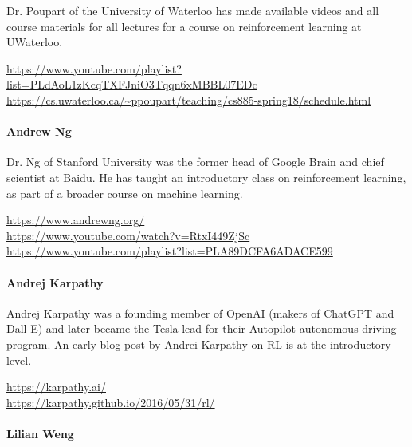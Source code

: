 Dr. Poupart of the University of Waterloo has made available videos and all course materials for all lectures for a course on reinforcement learning at UWaterloo. \\

\begin{resourcebox}
\footnotesize
\url{https://www.youtube.com/playlist?list=PLdAoL1zKcqTXFJniO3Tqqn6xMBBL07EDc} \\

\url{https://cs.uwaterloo.ca/~ppoupart/teaching/cs885-spring18/schedule.html}
\end{resourcebox}


\paragraph*{Andrew Ng}

Dr. Ng of Stanford University was the former head of Google Brain and chief scientist at Baidu. He has taught an introductory class on reinforcement learning, as part of a broader course on machine learning. \\

\begin{resourcebox}
\footnotesize
\url{https://www.andrewng.org/} \\

\url{https://www.youtube.com/watch?v=RtxI449ZjSc} \\

\url{https://www.youtube.com/playlist?list=PLA89DCFA6ADACE599}
\end{resourcebox}


\paragraph*{Andrej Karpathy}

Andrej Karpathy was a founding member of OpenAI (makers of ChatGPT and Dall-E) and later became the Tesla lead for their Autopilot autonomous driving program. An early blog post by Andrei Karpathy on RL is at the introductory level. \\

\begin{resourcebox}
\footnotesize
\url{https://karpathy.ai/} \\

\url{https://karpathy.github.io/2016/05/31/rl/}
\end{resourcebox}


\paragraph*{Lilian Weng}

